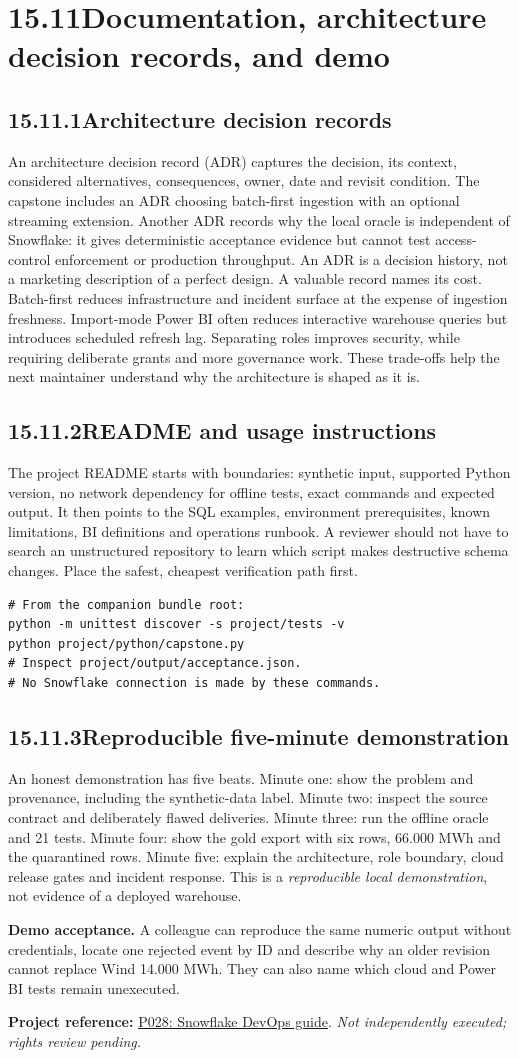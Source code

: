 \documentclass[11pt,twoside]{article}
\newcommand{\topic}[2]{\subsection*{#1\quad #2}}
\newcommand{\repo}[2]{\par\begingroup\fontsize{8.0}{9.6}\selectfont\sffamily\color{inkgray}\textbf{Project reference:} \href{#2}{#1}. \textit{Not independently executed; rights review pending.}\par\endgroup}
\begin{document}
\section*{15.11\quad Documentation, architecture decision records, and demo}
\topic{15.11.1}{Architecture decision records}
An architecture decision record (ADR) captures the decision, its context, considered alternatives, consequences, owner, date and revisit condition. The capstone includes an ADR choosing batch-first ingestion with an optional streaming extension. Another ADR records why the local oracle is independent of Snowflake: it gives deterministic acceptance evidence but cannot test access-control enforcement or production throughput. An ADR is a decision history, not a marketing description of a perfect design.
A valuable record names its cost. Batch-first reduces infrastructure and incident surface at the expense of ingestion freshness. Import-mode Power BI often reduces interactive warehouse queries but introduces scheduled refresh lag. Separating roles improves security, while requiring deliberate grants and more governance work. These trade-offs help the next maintainer understand why the architecture is shaped as it is.
\topic{15.11.2}{README and usage instructions}
The project README starts with boundaries: synthetic input, supported Python version, no network dependency for offline tests, exact commands and expected output. It then points to the SQL examples, environment prerequisites, known limitations, BI definitions and operations runbook. A reviewer should not have to search an unstructured repository to learn which script makes destructive schema changes. Place the safest, cheapest verification path first.
\begin{lstlisting}
# From the companion bundle root:
python -m unittest discover -s project/tests -v
python project/python/capstone.py
# Inspect project/output/acceptance.json.
# No Snowflake connection is made by these commands.
\end{lstlisting}
\topic{15.11.3}{Reproducible five-minute demonstration}
An honest demonstration has five beats. Minute one: show the problem and provenance, including the synthetic-data label. Minute two: inspect the source contract and deliberately flawed deliveries. Minute three: run the offline oracle and 21 tests. Minute four: show the gold export with six rows, 66.000 MWh and the quarantined rows. Minute five: explain the architecture, role boundary, cloud release gates and incident response. This is a \emph{reproducible local demonstration}, not evidence of a deployed warehouse.
\begin{whitebox}\textbf{Demo acceptance.} A colleague can reproduce the same numeric output without credentials, locate one rejected event by ID and describe why an older revision cannot replace Wind 14.000 MWh. They can also name which cloud and Power BI tests remain unexecuted.\end{whitebox}
\repo{P028: Snowflake DevOps guide}{https://github.com/Snowflake-Labs/sfguide-getting-started-with-snowflake-devops}
\end{document}
